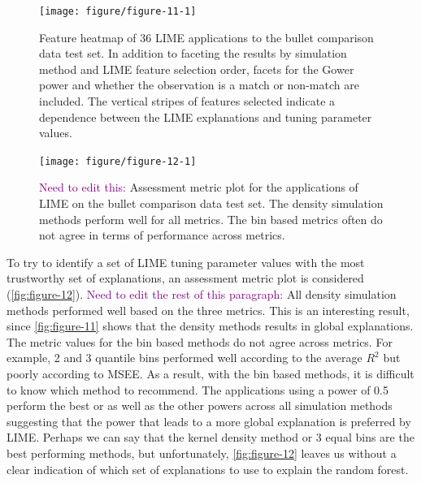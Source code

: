 \documentclass[AMS,STIX2COL]{WileyNJD-v2}\usepackage[]{graphicx}\usepackage[]{color}
\newenvironment{knitrout}{}{} %
\newcommand{\kgc}[1]{\textcolor{purple}{#1}}
\begin{document}
\begin{figure}[!thp]
\begin{knitrout}
\color{fgcolor}

{\centering \texttt{[image: figure/figure-11-1]} 

}



\end{knitrout}
\caption{Feature heatmap of 36 LIME applications to the bullet comparison data test set. In addition to faceting the results by simulation method and LIME feature selection order, facets for the Gower power and whether the observation is a match or non-match are included. The vertical stripes of features selected indicate a dependence between the LIME explanations and tuning parameter values.}
\label{fig:figure-11}

\vspace*{\floatsep}

\begin{knitrout}
\color{fgcolor}

{\centering \texttt{[image: figure/figure-12-1]} 

}



\end{knitrout}
\caption{\kgc{Need to edit this:} Assessment metric plot for the applications of LIME on the bullet comparison data test set. The density simulation methods perform well for all metrics. The bin based metrics often do not agree in terms of performance across metrics.}
\label{fig:figure-12}
\end{figure}

To try to identify a set of LIME tuning parameter values with the most trustworthy set of explanations, an assessment metric plot is considered (\autoref{fig:figure-12}). \kgc{Need to edit the rest of this paragraph:} All density simulation methods performed well based on the three metrics. This is an interesting result, since \autoref{fig:figure-11} shows that the density methods results in global explanations. The metric values for the bin based methods do not agree across metrics. For example, 2 and 3 quantile bins performed well according to the average $R^2$ but poorly according to MSEE. As a result, with the bin based methods, it is difficult to know which method to recommend. The applications using a power of 0.5 perform the best or as well as the other powers across all simulation methods suggesting that the power that leads to a more global explanation is preferred by LIME. Perhaps we can say that the kernel density method or 3 equal bins  are the best performing methods, but unfortunately, \autoref{fig:figure-12} leaves us without a clear indication of which set of explanations to use to explain the random forest. 
\end{document}
